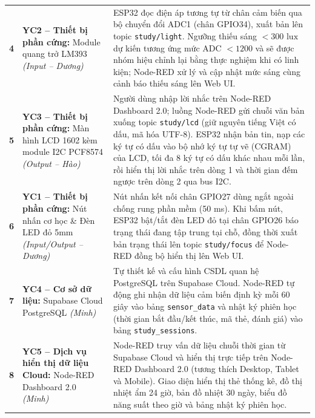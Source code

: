 \begin{longtable}{|>{\centering\arraybackslash}p{0.8cm}|>{\raggedright\arraybackslash}p{4.5cm}|>{\raggedright\arraybackslash}p{11.3cm}|}
\hline
\multicolumn{3}{|c|}{\textbf{Thông tin chức năng nâng cao (Yêu cầu nâng cao)}} \\ \hline

\textbf{4} & \textbf{YC2 -- Thiết bị phần cứng:} \newline Module quang trở LM393 \newline \textit{(Input -- Dương)} & ESP32 đọc điện áp tương tự từ chân cảm biến qua bộ chuyển đổi ADC1 (chân GPIO34), xuất bản lên topic \texttt{study/light}. Ngưỡng thiếu sáng $<300\text{ lux}$ dự kiến tương ứng mức ADC $<1200$ và sẽ được nhóm hiệu chỉnh lại bằng thực nghiệm khi có linh kiện; Node-RED xử lý và cập nhật mức sáng cùng cảnh báo thiếu sáng lên Web UI. \\ \hline

\textbf{5} & \textbf{YC3 -- Thiết bị phần cứng:} \newline Màn hình LCD 1602 kèm module I2C PCF8574 \newline \textit{(Output -- Hào)} & Người dùng nhập lời nhắc trên Node-RED Dashboard 2.0; luồng Node-RED gửi chuỗi văn bản xuống topic \texttt{study/lcd} (giữ nguyên tiếng Việt có dấu, mã hóa UTF-8). ESP32 nhận bản tin, nạp các ký tự có dấu vào bộ nhớ ký tự tự vẽ (CGRAM) của LCD, tối đa 8 ký tự có dấu khác nhau mỗi lần, rồi hiển thị lời nhắc trên dòng 1 và thời gian đếm ngược trên dòng 2 qua bus I2C. \\ \hline

\textbf{6} & \textbf{YC1 -- Thiết bị phần cứng:} \newline Nút nhấn cơ học \& Đèn LED đỏ 5mm \newline \textit{(Input/Output -- Dương)} & Nút nhấn kết nối chân GPIO27 dùng ngắt ngoài chống rung phần mềm (50 ms). Khi bấm nút, ESP32 bật/tắt đèn LED đỏ tại chân GPIO26 báo trạng thái đang tập trung tại chỗ, đồng thời xuất bản trạng thái lên topic \texttt{study/focus} để Node-RED đồng bộ hiển thị lên Web UI. \\ \hline

\textbf{7} & \textbf{YC4 -- Cơ sở dữ liệu:} \newline Supabase Cloud PostgreSQL \newline \textit{(Minh)} & Tự thiết kế và cấu hình CSDL quan hệ PostgreSQL trên Supabase Cloud. Node-RED tự động ghi nhận dữ liệu cảm biến định kỳ mỗi 60 giây vào bảng \texttt{sensor\_data} và nhật ký phiên học (thời gian bắt đầu/kết thúc, mã thẻ, đánh giá) vào bảng \texttt{study\_sessions}. \\ \hline

\textbf{8} & \textbf{YC5 -- Dịch vụ hiển thị dữ liệu Cloud:} \newline Node-RED Dashboard 2.0 \newline \textit{(Minh)} & Node-RED truy vấn dữ liệu chuỗi thời gian từ Supabase Cloud và hiển thị trực tiếp trên Node-RED Dashboard 2.0 (tương thích Desktop, Tablet và Mobile). Giao diện hiển thị thẻ thống kê, đồ thị nhiệt ẩm 24 giờ, bản đồ nhiệt 30 ngày, biểu đồ năng suất theo giờ và bảng nhật ký phiên học. \\ \hline


\end{longtable}
